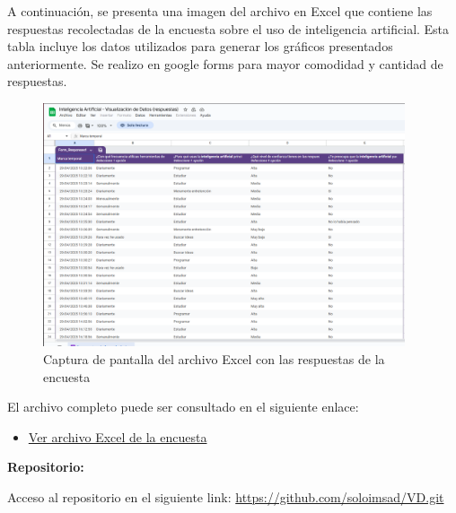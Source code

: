 \documentclass[12pt, a4paper]{article}
\begin{document}
A continuación, se presenta una imagen del archivo en Excel que contiene las respuestas recolectadas de la encuesta sobre el uso de inteligencia artificial. Esta tabla incluye los datos utilizados para generar los gráficos presentados anteriormente. Se realizo en google forms para mayor comodidad y cantidad de respuestas. 

\begin{figure}[H]
    \centering
    \includegraphics[width=0.95\textwidth]{Graficos/excel.png} %
    \caption{Captura de pantalla del archivo Excel con las respuestas de la encuesta}
\end{figure}

El archivo completo puede ser consultado en el siguiente enlace:

\begin{itemize}
    \item \href{https://docs.google.com/spreadsheets/d/1KRdGL7pflDiA8TAT_pvPSt6OpXGPv6h4NTGceC8xDS0/edit?resourcekey=&gid=168064728#gid=168064728}{Ver archivo Excel de la encuesta}
\end{itemize}


\textbf{Repositorio:}  
\label{anexo:repositorio}

Acceso al repositorio en el siguiente link: 
\url{https://github.com/soloimsad/VD.git}
\end{document}
